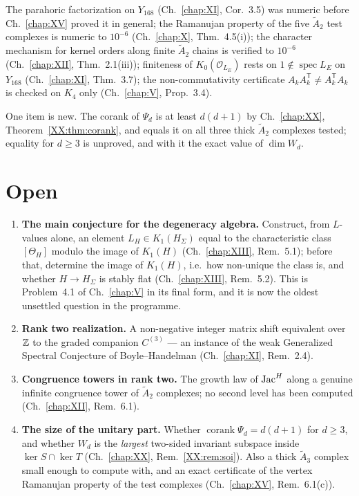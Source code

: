 The parahoric factorization on $Y_{168}$ (Ch.~\ref{chap:XI}, Cor.~3.5) was numeric
before Ch.~\ref{chap:XV} proved it in general; the Ramanujan property of the five
$\widetilde A_2$ test complexes is numeric to $10^{-6}$ (Ch.~\ref{chap:X}, Thm.~4.5(i));
the character mechanism for kernel orders along finite $\widetilde A_2$ chains is
verified to $10^{-6}$ (Ch.~\ref{chap:XII}, Thm.~2.1(iii)); finiteness of
$K_0(\mathcal O_{L_E})$ rests on $1\notin\operatorname{spec}L_E$ on $Y_{168}$
(Ch.~\ref{chap:XI}, Thm.~3.7); the non-commutativity certificate
$A_kA_k^{\mathsf T}\ne A_k^{\mathsf T}A_k$ is checked on $K_4$ only (Ch.~\ref{chap:V},
Prop.~3.4).

One item is new. The corank of $\Psi_d$ is at least $d(d+1)$ by
Ch.~\ref{chap:XX}, Theorem~\ref{XX:thm:corank}, and equals it on all three thick
$\widetilde A_2$ complexes tested; equality for $d\ge3$ is unproved, and with it the exact
value of $\dim W_d$.

\section{Open}

\begin{enumerate}
\item \textbf{The main conjecture for the degeneracy algebra.} Construct, from
$L$-values alone, an element $L_H\in K_1(H_\Sigma)$ equal to the characteristic class
$[\Theta_H]$ modulo the image of $K_1(H)$ (Ch.~\ref{chap:XIII}, Rem.~5.1); before that,
determine the image of $K_1(H)$, i.e.\ how non-unique the class is, and whether
$H\to H_\Sigma$ is stably flat (Ch.~\ref{chap:XIII}, Rem.~5.2). This is Problem~4.1 of
Ch.~\ref{chap:V} in its final form, and it is now the oldest unsettled question in the
programme.
\item \textbf{Rank two realization.} A non-negative integer matrix shift equivalent
over $\mathbb{Z}$ to the graded companion $C^{(3)}$ --- an instance of the weak Generalized
Spectral Conjecture of Boyle--Handelman (Ch.~\ref{chap:XI}, Rem.~2.4).
\item \textbf{Congruence towers in rank two.} The growth law of $\operatorname{Jac}^H$ along a genuine
infinite congruence tower of $\widetilde A_2$ complexes; no second level has been
computed (Ch.~\ref{chap:XII}, Rem.~6.1).
\item \textbf{The size of the unitary part.} Whether
$\operatorname{corank}\Psi_d=d(d+1)$ for $d\ge3$, and whether $W_d$ is the \emph{largest}
two-sided invariant subspace inside $\ker S\cap\ker T$ (Ch.~\ref{chap:XX},
Rem.~\ref{XX:rem:soi}). Also a thick $\widetilde A_3$ complex small enough to compute with,
and an exact certificate of the vertex Ramanujan property of the test complexes
(Ch.~\ref{chap:XV}, Rem.~6.1(c)).
\end{enumerate}

